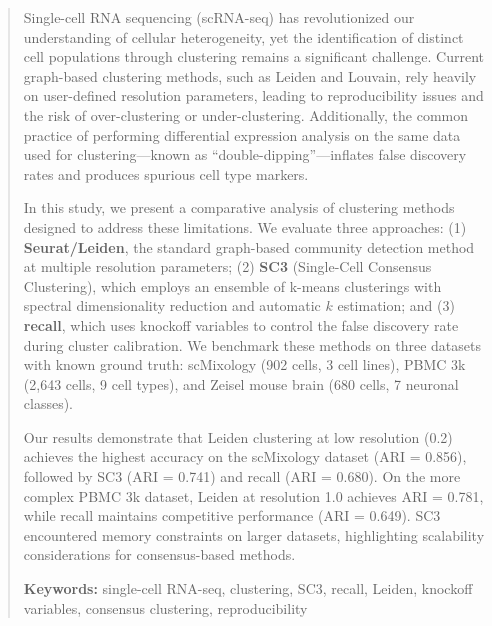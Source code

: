 
\begin{abstract}

Single-cell RNA sequencing (scRNA-seq) has revolutionized our understanding of cellular heterogeneity, yet the identification of distinct cell populations through clustering remains a significant challenge. Current graph-based clustering methods, such as Leiden and Louvain, rely heavily on user-defined resolution parameters, leading to reproducibility issues and the risk of over-clustering or under-clustering. Additionally, the common practice of performing differential expression analysis on the same data used for clustering---known as ``double-dipping''---inflates false discovery rates and produces spurious cell type markers.

In this study, we present a comparative analysis of clustering methods designed to address these limitations. We evaluate three approaches: (1) \textbf{Seurat/Leiden}, the standard graph-based community detection method at multiple resolution parameters; (2) \textbf{SC3} (Single-Cell Consensus Clustering), which employs an ensemble of k-means clusterings with spectral dimensionality reduction and automatic $k$ estimation; and (3) \textbf{recall}, which uses knockoff variables to control the false discovery rate during cluster calibration. We benchmark these methods on three datasets with known ground truth: scMixology (902 cells, 3 cell lines), PBMC 3k (2,643 cells, 9 cell types), and Zeisel mouse brain (680 cells, 7 neuronal classes).

Our results demonstrate that Leiden clustering at low resolution (0.2) achieves the highest accuracy on the scMixology dataset (ARI = 0.856), followed by SC3 (ARI = 0.741) and recall (ARI = 0.680). On the more complex PBMC 3k dataset, Leiden at resolution 1.0 achieves ARI = 0.781, while recall maintains competitive performance (ARI = 0.649). SC3 encountered memory constraints on larger datasets, highlighting scalability considerations for consensus-based methods.

\vspace{1em}
\noindent\textbf{Keywords:} single-cell RNA-seq, clustering, SC3, recall, Leiden, knockoff variables, consensus clustering, reproducibility

\end{abstract}
